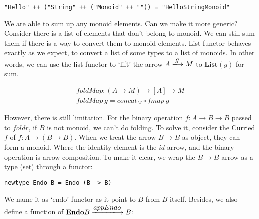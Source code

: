\documentclass{article}
\begin{document}
\begin{verbatim}
"Hello" ++ ("String" ++ ("Monoid" ++ "")) = "HelloStringMonoid"
\end{verbatim}

We are able to sum up any monoid elements. Can we make it more generic? Consider there is a list of elements that don't belong to monoid. We can still sum them if there is a way to convert them to monoid elements. List functor behaves exactly as we expect, to convert a list of some types to a list of monoids. In other words, we can use the list functor to `lift' the arrow $A \arrowto{g} M$ to $\mathbf{List}(g)$ for sum.

\begin{center}
\end{center}

\[
\begin{array}{l}
foldMap : (A \to M) \to [A] \to M \\
foldMap\ g = concat_M \circ fmap\ g
\end{array}
\]

However, there is still limitation. For the binary operation $f : A \to B \to B$ passed to $foldr$, if $B$ is not monoid, we can't do folding. To solve it, consider the Curried $f$ of $f : A \to (B \to B)$. When we treat the arrow $B \to B$ as object, they can form a monoid. Where the identity element is the $id$ arrow, and the binary operation is arrow composition. To make it clear, we wrap the $B \to B$ arrow as a type (set) through a functor:

\lstset{frame=none}
\begin{lstlisting}[style=Haskell]
newtype Endo B = Endo (B -> B)
\end{lstlisting}

We name it as `endo' functor as it point to $B$ from $B$ itself. Besides, we also define a function of $\mathbf{Endo}B \arrowto{appEndo} B$:
\end{document}
